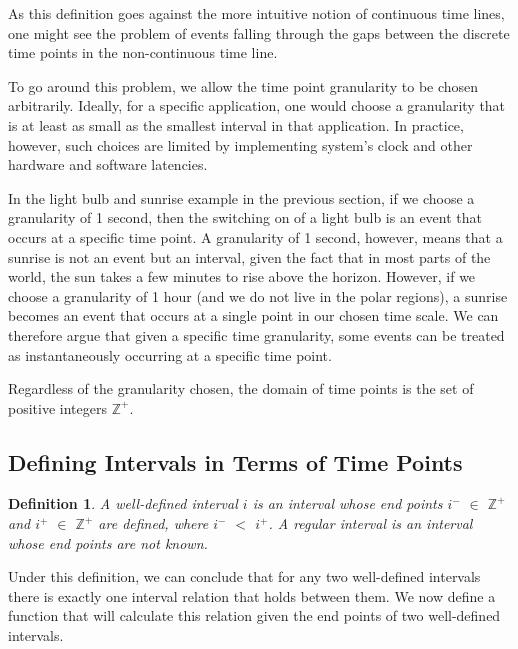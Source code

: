 \documentclass[11pt]{report}
\newtheorem{vdefinition}{Definition}
\begin{document}
        As this definition goes against the more intuitive notion of continuous time
        lines, one might see the problem of events falling through the gaps between
        the discrete time points in the non-continuous time line.

        To go around this problem, we allow the time point granularity to be chosen
        arbitrarily. Ideally, for a specific application, one would choose a
        granularity that is at least as small as the smallest interval in that
        application. In practice, however, such choices are limited by implementing
        system's clock and other hardware and software latencies.

        In the light bulb and sunrise example in the previous section, if we
        choose a granularity of 1 second, then the switching on of a light bulb is an
        event that occurs at a specific time point. A granularity of 1 second,
        however, means that a sunrise is not an event but an interval, given the fact
        that in most parts of the world, the sun takes a few minutes to rise above the
        horizon. However, if we choose a granularity of 1 hour (and we do not
        live in the polar regions), a sunrise becomes an event that occurs at a single
        point in our chosen time scale. We can therefore argue that given a specific
        time granularity, some events can be treated as instantaneously occurring at a
        specific time point.

        Regardless of the granularity chosen, the domain of time points is the set of
        positive integers ${\mathbb Z}^{+}$.

      \subsection{Defining Intervals in Terms of Time Points}

        \begin{vdefinition}
          \label{def-interval}
          A {\em well-defined interval} $i$ is an interval whose end points $i^{-}$
          $\in$ ${\mathbb Z}^{+}$ and $i^{+}$ $\in$ ${\mathbb Z}^{+}$ are defined,
          where $i^{-}$ $<$ $i^{+}$. A {\em regular interval} is an interval whose
          end points are not known.
        \end{vdefinition}

        Under this definition, we can conclude that for any two well-defined
        intervals there is exactly one interval relation that holds between
        them. We now define a function that will calculate this relation given
        the end points of two well-defined intervals.
\end{document}
